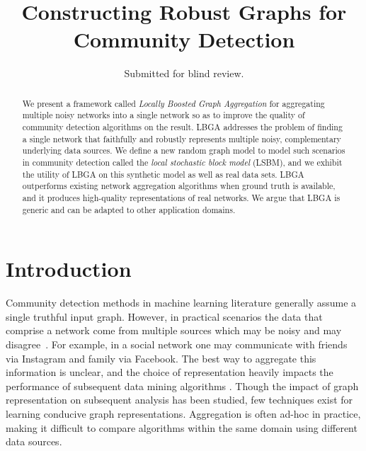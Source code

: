 \documentclass{article}
\title{\Large Constructing Robust Graphs for Community Detection}
\begin{document}
\author{Submitted for blind review.}


\maketitle

\begin{abstract} 

We present a framework called \emph{Locally Boosted Graph Aggregation} for
aggregating multiple noisy networks into a single network so as to improve the
quality of community detection algorithms on the result. LBGA addresses the
problem of finding a single network that faithfully and robustly represents
multiple noisy, complementary underlying data sources. We define a new random
graph model to model such scenarios in community detection called the
\emph{local stochastic block model} (LSBM), and we exhibit the utility of LBGA
on this synthetic model as well as real data sets. LBGA outperforms existing
network aggregation algorithms when ground truth is available, and it produces
high-quality representations of real networks. We argue that LBGA is generic
and can be adapted to other application domains.

\end{abstract}

\section{Introduction}
Community detection methods in machine learning literature generally assume a
single truthful input graph. However, in practical scenarios the data that
comprise a network come from multiple sources which may be noisy and may
disagree~\cite{Leskovec2008}. For example, in a social network one may
communicate with friends via Instagram and family via Facebook. The best way to
aggregate this information is unclear, and the choice of representation heavily
impacts the performance of subsequent data mining algorithms
\cite{Getoor2005,Caceres2011,Miller2014}.  Though the impact of graph
representation on subsequent analysis has been studied, few techniques exist
for learning conducive graph representations. Aggregation is often ad-hoc in
practice, making it difficult to compare algorithms within the same domain
using different data sources.
\end{document}
